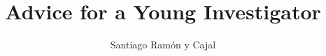\documentclass{article}
\title{Advice for a Young Investigator}
\author{Santiago Ramón y Cajal}
\date{}
\begin{document}
\maketitle

\tableofcontents

\begin{comment} 

\section*{Foreword}

Santiago Ramón y Cajal (1852–1934) is one of the more fascinating personalities in science. Above all he was the most important neuroanatomist since Andreas Vesalius, the Renaissance founder of modern biology. However, Cajal was also a thoughtful and inspired teacher, he made several lasting contributions to Spanish literature (his autobiography, a popular book of aphorisms, and reflections on old age), and he wrote one of the early books on the theory and practice of color photography. Furthermore, he was an exceptional artist, perhaps the best ever to draw the circuits of the brain, which he could never photograph to his satisfaction.

In his early thirties, Cajal wrote and illustrated the first original textbook of histology in Spain, which remained a standard throughout his lifetime. The first draft of his unique book of practical, fatherly advice to young people in the early stages of their research careers was begun soon after moving to the chair of histology and pathological anatomy at the University of Madrid about a decade later - when he also wrote the first major review of his investigations with Camillo Golgi’s silver chromate method: New Ideas on the Structure of the Nervous System (1894).

This succinct book redefined how brain circuits had been described. In it, Cajal presented histological evidence that the central nervous system is not a syncytium or reticulum of cells as commonly believed at the time. Instead, it consists of individual neurons that usually conduct information in just one direction. The information output of the neuron is down a single axon and its branches to terminal boutons that end on or near the input side of another neuron (its cell body and dendrites). Cajal had discovered the synapse and with fundamental insight went on to describe the organization of all the major neural systems in terms of chains of independent neurons and the concept of functional polarity (unidirectional information flow in circuits). He was the first to explain in modern terms the organization of reflex and voluntary control pathways to the motor system, and this conceptual advance was the structural foundation of Sir Charles Sherrington’s modern physiological explanation of reflexes and their control.


\end{comment}
\end{document}
